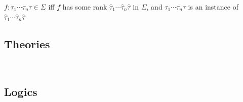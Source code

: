 {$f{:}\tau_1\cdots\tau_n\tau \in \Sigma$
iff $f$ has some rank $\hat\tau_1\cdots\hat\tau_n\hat\tau$ in $\Sigma$, and
$\tau_1\cdots\tau_n\tau$ is an instance of $\hat\tau_1\cdots\hat\tau_n\hat\tau$

\medskip

\termrules
\medskip

\subsection*{Theories}
\ 

\theories
\medskip

\subsection*{Logics}
\ 

\logics
\medskip

%
%
%
%
%

}

